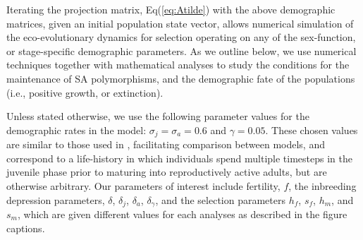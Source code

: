\documentclass[11pt]{article}
\def\mbf#1{\mathbf{#1}}
\def\mcal#1{\mathcal{#1}}
\begin{document}
Iterating the projection matrix, Eq(\ref{eq:Atilde}) with the above demographic matrices, given an initial population state vector, allows numerical simulation of the eco-evolutionary dynamics for selection operating on any of the sex-function, or stage-specific demographic parameters. As we outline below, we use numerical techniques together with mathematical analyses to study the conditions for the maintenance of SA polymorphisms, and the demographic fate of the populations (i.e., positive growth, or extinction).

Unless stated otherwise, we use the following parameter values for the demographic rates in the model: $\sigma_j = \sigma_a = 0.6$ and $\gamma = 0.05$. These chosen values are similar to those used in \citet{deVriesCaswell2019b}, facilitating comparison between models, and correspond to a life-history in which individuals spend multiple timesteps in the juvenile phase prior to maturing into reproductively active adults, but are otherwise arbitrary. Our parameters of interest include fertility, $f$, the inbreeding depression parameters, $\delta$, $\delta_j$, $\delta_a$, $\delta_{\gamma}$, and the selection parameters $h_f$, $s_f$, $h_m$, and $s_m$, which are given different values for each analyses as described in the figure captions. 


\end{document}
